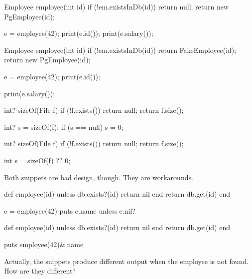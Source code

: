 \documentclass{article}
\begin{document}

\begin{pptWide}{2}
{\small\begin{ffcode}
Employee employee(int id) {
  if (!em.existsInDb(id)) {
    return null;
  }
  return new PgEmployee(id);
}

e = employee(42);
print(e.id());
print(e.salary());
\end{ffcode}
}
\par\columnbreak\par
{\small\begin{ffcode}
Employee employee(int id) {
  if (!em.existsInDb(id)) {
    return FakeEmployee(id);
  }
  return new PgEmployee(id);
}

e = employee(42);
print(e.id());

print(e.salary());
\end{ffcode}
}
\end{pptWide}
\par
\plush{}


\begin{pptWide}{2}
{\small\begin{ffcode}
int? sizeOf(File f) {
  if (!f.exists()) {
    return null;
  }
  return f.size();
}

int? s = sizeOf(f);
if (s == null) {
  s = 0;
}
\end{ffcode}
}
\par\columnbreak\par
{\small\begin{ffcode}
int? sizeOf(File f) {
  if (!f.exists()) {
    return null;
  }
  return f.size();
}

int s = sizeOf(f) ?? 0;
\end{ffcode}
}
\end{pptWide}
\par
Both snippets are bad design, though. They are workarounds.
\plush{}

\begin{pptWide}{2}
{\small\begin{ffcode}
def employee(id)
  unless db.exists?(id)
    return nil
  end
  return db.get(id)
end

e = employee(42)
puts e.name unless e.nil?
\end{ffcode}
}
\par\columnbreak\par
{\small\begin{ffcode}
def employee(id)
  unless db.exists?(id)
    return nil
  end
  return db.get(id)
end

puts employee(42)&.name
\end{ffcode}
}
\end{pptWide}
\par
Actually, the snippets produce different output when the employee is not found. How are they different?
\plush{}
\end{document}
